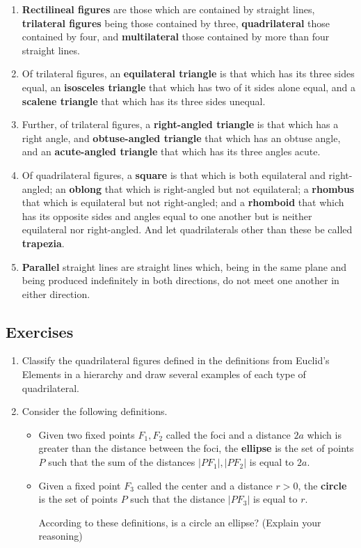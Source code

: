 \documentclass[
]{book}
\theoremstyle{definition}
\theoremstyle{definition}
\theoremstyle{definition}
\theoremstyle{definition}
\theoremstyle{remark}
\begin{document}
\begin{enumerate}
\item
  \textbf{Rectilineal figures} are those which are contained by straight lines, \textbf{trilateral figures} being those contained by three, \textbf{quadrilateral} those contained by four, and \textbf{multilateral} those contained by more than four straight lines.
\item
  Of trilateral figures, an \textbf{equilateral triangle} is that which has its three sides equal, an \textbf{isosceles triangle} that which has two of it sides alone equal, and a \textbf{scalene triangle} that which has its three sides unequal.
\item
  Further, of trilateral figures, a \textbf{right-angled triangle} is that which has a right angle, and \textbf{obtuse-angled triangle} that which has an obtuse angle, and an \textbf{acute-angled triangle} that which has its three angles acute.
\item
  Of quadrilateral figures, a \textbf{square} is that which is both equilateral and right-angled; an \textbf{oblong} that which is right-angled but not equilateral; a \textbf{rhombus} that which is equilateral but not right-angled; and a \textbf{rhomboid} that which has its opposite sides and angles equal to one another but is neither equilateral nor right-angled. And let quadrilaterals other than these be called \textbf{trapezia}.
\item
  \textbf{Parallel} straight lines are straight lines which, being in the same plane and being produced indefinitely in both directions, do not meet one another in either direction.
\end{enumerate}

\hypertarget{exercises-36}{%
\subsection{Exercises}\label{exercises-36}}

\begin{enumerate}
\def\labelenumi{\arabic{enumi}.}
\item
  Classify the quadrilateral figures defined in the definitions from Euclid's Elements in a hierarchy and draw several examples of each type of quadrilateral.
\item
  Consider the following definitions.

  \begin{itemize}
  \item
    Given two fixed points \(F_1, F_2\) called the foci and a distance \(2a\) which is greater than the distance between the foci, the \textbf{ellipse} is the set of points \(P\) such that the sum of the distances \(|PF_{1}|, |PF_{2}|\) is equal to \(2a\).
  \item
    Given a fixed point \(F_3\) called the center and a distance \(r>0\), the \textbf{circle} is the set of points \(P\) such that the distance \(|PF_3|\) is equal to \(r\).

    According to these definitions, is a circle an ellipse? (Explain your reasoning)
  \end{itemize}
\end{enumerate}
\end{document}
